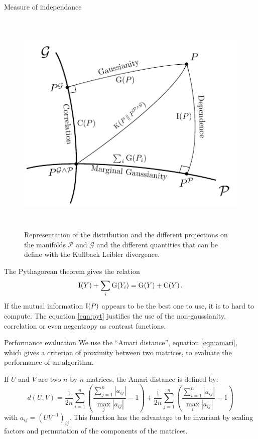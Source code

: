 \documentclass{beamer}
\newcommand{\zZ}[2]{\mathrm #1\!\zp{#2}}
\newcommand{\zD}{\mathcal}
\begin{document}
\begin{frame}{}
\begin{columns}[T]
\begin{column}{.48\linewidth}
\begin{block}{Measure of independance}
\begin{figure}
\label{fig:sketch}
\centering
  \includegraphics[height = 11cm, width=\textwidth]{../figure_tikz/theory_info}
  \caption{Representation of the distribution and the different projections on the manifolds $\zD P$ and $\zD G$ and the different quantities that can be define with the Kullback Leibler divergence.}
\end{figure}

The Pythagorean theorem gives the relation
\begin{equation}
\label{eqn:pyt}
        \zZ IY + \sum_i\zZ G{Y_i} = \zZ GY + \zZ CY.
\end{equation}
If the mutual information $\zZ I P$ appears to be the best one to use, it is to hard to compute.
The equation \ref{eqn:pyt} justifies the use of the non-gaussianity, correlation or even negentropy as contrast functions.

\end{block}


\begin{block}{Performance evaluation}
We use the ``Amari distance'', equation \ref{eqn:amari}, which gives a criterion of proximity between two matrices, to evaluate the performance of an algorithm.

If $U$ and $V$ are two $n$-by-$n$ matrices, the Amari distance is defined by:
\begin{equation} \label{eqn:amari}
	d(U,V) = \frac{1}{2n}\sum\limits_{i=1}^n \left(\frac{\sum\limits_{j=1}^n|a_{ij}|}{\max_j |a_{ij}|}-1 \right)+\frac{1}{2n}\sum\limits_{j=1}^n \left(\frac{\sum\limits_{i=1}^n|a_{ij}|}{\max_i |a_{ij}|}-1 \right)
\end{equation}
with $a_{ij} = (UV^{-1})_{ij}$.
This function has the advantage to be invariant by scaling factors and permutation of the components of the matrices.


\end{block}
\end{column}
\end{columns}
\end{frame}
\end{document}
